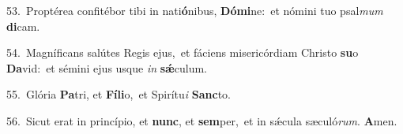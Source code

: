 {\numbfont\textcolor{\numbcolor}{53.}}~Proptérea confitébor tibi in nati\-\textbf{ó}\-nibus, \textbf{Dó}\-\textbf{mi}ne:~\star et nómini tuo psal\textit{mum} \textbf{di}\-cam.\par
{\numbfont\textcolor{\numbcolor}{54.}}~Magníficans salútes Regis ejus,~\dagger et fáciens misericórdiam Christo \textbf{su}\-o \textbf{Da}\-vid:~\star et sémini ejus usque \textit{in} \textbf{sǽ}\-culum.\par
{\numbfont\textcolor{\numbcolor}{55.}}~Glória \textbf{Pa}\-tri, et \textbf{Fí}\-\textbf{li}o,~\star et Spirítu\textit{i} \textbf{Sanc}\-to.\par
{\numbfont\textcolor{\numbcolor}{56.}}~Sicut erat in princípio, et \textbf{nunc}\-, et \textbf{sem}\-per,~\star et in sǽcula sæculó\-\textit{rum}\-. \textbf{A}\-men.\par
